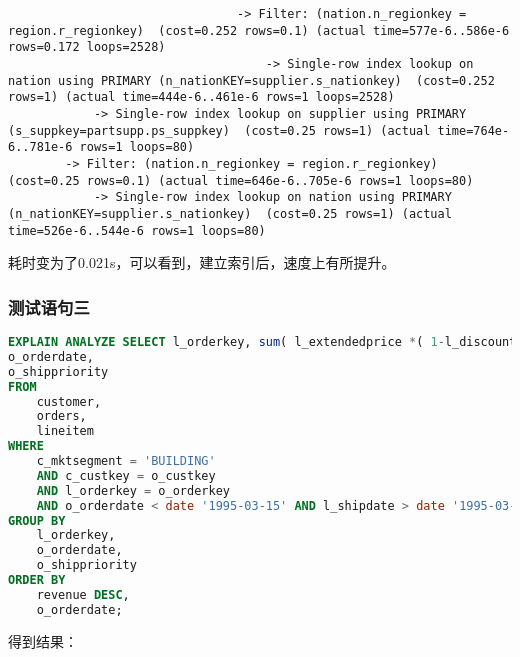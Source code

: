 \documentclass{article}
\begin{document}
\begin{lstlisting}
                                -> Filter: (nation.n_regionkey = region.r_regionkey)  (cost=0.252 rows=0.1) (actual time=577e-6..586e-6 rows=0.172 loops=2528)
                                    -> Single-row index lookup on nation using PRIMARY (n_nationKEY=supplier.s_nationkey)  (cost=0.252 rows=1) (actual time=444e-6..461e-6 rows=1 loops=2528)
            -> Single-row index lookup on supplier using PRIMARY (s_suppkey=partsupp.ps_suppkey)  (cost=0.25 rows=1) (actual time=764e-6..781e-6 rows=1 loops=80)
        -> Filter: (nation.n_regionkey = region.r_regionkey)  (cost=0.25 rows=0.1) (actual time=646e-6..705e-6 rows=1 loops=80)
            -> Single-row index lookup on nation using PRIMARY (n_nationKEY=supplier.s_nationkey)  (cost=0.25 rows=1) (actual time=526e-6..544e-6 rows=1 loops=80)

\end{lstlisting}

耗时变为了0.021s，可以看到，建立索引后，速度上有所提升。

\subsubsection{测试语句三}

\begin{lstlisting}[language=sql]
EXPLAIN ANALYZE SELECT l_orderkey, sum( l_extendedprice *( 1-l_discount )) AS revenue,
o_orderdate,
o_shippriority 
FROM
    customer,
    orders,
    lineitem 
WHERE
    c_mktsegment = 'BUILDING' 
    AND c_custkey = o_custkey 
    AND l_orderkey = o_orderkey 
    AND o_orderdate < date '1995-03-15' AND l_shipdate > date '1995-03-15' 
GROUP BY
    l_orderkey,
    o_orderdate,
    o_shippriority 
ORDER BY
    revenue DESC,
    o_orderdate;
\end{lstlisting}

得到结果：
\end{document}
